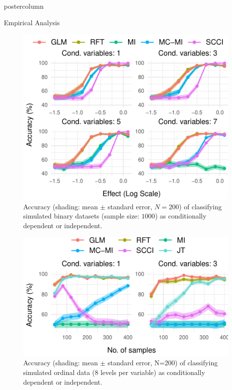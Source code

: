 \documentclass{beamer}
\begin{document}
\begin{frame}
\begin{columns}
\begin{column}{.33\textwidth}
\begin{beamercolorbox}[center]{postercolumn}
\begin{minipage}{.98\textwidth}
{\begin{myblock}{Empirical Analysis}
\begin{figure}
							\includegraphics[scale=3]{../in_person/imgs/accuracy.pdf}
							\caption{Accuracy (shading: mean $\pm$ standard error, $N=200$) of classifying
							simulated binary datasets (sample size: $1000$) as conditionally
							dependent or independent.}
							\label{fig:cat_discrimination}
						\end{figure}
						\begin{figure}
							\centering
							\includegraphics[scale=3]{../in_person/imgs/accuracy_ordinal.pdf}
							\caption{Accuracy (shading: mean $\pm$ standard error, N=200) of
								classifying simulated ordinal data (8 levels per variable) as
								conditionally dependent or independent.}
							\label{fig:accuracy_ord}
						\end{figure}
						\begin{figure}
							\centering

\end{figure}
\end{myblock}}
\end{minipage}
\end{beamercolorbox}
\end{column}
\end{columns}
\end{frame}
\end{document}
